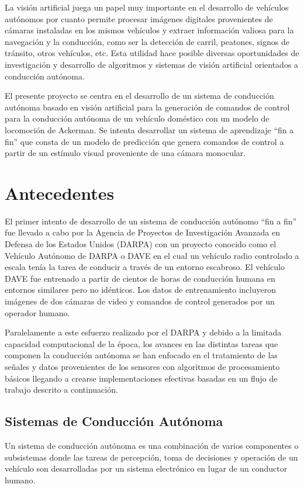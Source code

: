 \documentclass[12pt,letterpaper]{article}
\begin{document}
La visión artificial juega un papel muy importante en el desarrollo de vehículos autónomos por cuanto permite 
procesar imágenes digitales provenientes de cámaras instaladas en los mismos vehículos y extraer información 
valiosa para la navegación y la conducción, como ser la detección de carril, peatones, signos de tránsito, otros vehículos, 
etc. Esta utilidad hace posible diversas oportunidades de investigación y desarrollo de algoritmos y sistemas de visión 
artificial orientados a conducción autónoma.

El presente proyecto se centra en el desarrollo de un sistema de conducción autónoma basado en visión artificial para 
la generación de comandos de control para la conducción autónoma de un vehículo doméstico con un modelo de locomoción 
de Ackerman. Se intenta desarrollar un sistema de aprendizaje “fin a fin” que consta de un modelo de predicción 
que genera comandos de control a partir de un estímulo visual proveniente de una cámara monocular.


\section{Antecedentes}


El primer intento de desarrollo de un sistema de conducción autónomo “fin a fin” fue llevado a cabo por la Agencia 
de Proyectos de Investigación Avanzada en Defensa de los Estados Unidos (DARPA) con un proyecto conocido 
como el Vehículo Autónomo de DARPA o DAVE \cite{lecun2004dave} en el cual un vehículo radio controlado a escala tenía la 
tarea de conducir a través de un entorno escabroso. El vehículo DAVE fue entrenado a partir de cientos de
horas de conducción humana en entornos similares pero no idénticos. Los datos de entrenamiento 
incluyeron imágenes de dos cámaras de video y comandos de control generados por un operador humano. 

Paralelamente a este esfuerzo realizado por el DARPA y debido a la limitada capacidad computacional de la época, 
los avances en las distintas tareas que componen la conducción autónoma se han enfocado en el tratamiento de las señales 
y datos provenientes de los sensores con algoritmos de procesamiento básicos llegando a crearse implementaciones efectivas 
basadas en un flujo de trabajo descrito a continuación.

\subsection{Sistemas de Conducción Autónoma}
Un sistema de conducción autónoma es una combinación de varios componentes o subsistemas donde las tareas 
de percepción, toma de decisiones y operación de un vehículo son desarrolladas por un sistema electrónico en lugar
de un conductor humano. 
\end{document}
